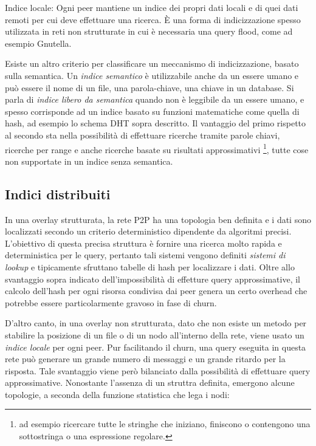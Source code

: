 Indice locale: Ogni peer mantiene un indice dei propri dati locali e di quei dati remoti per cui deve effettuare una ricerca. È una forma di indicizzazione spesso utilizzata in reti non strutturate in cui è necessaria una query flood, come ad esempio Gnutella.

Esiste un altro criterio per classificare un meccanismo di indicizzazione, basato sulla semantica. Un \emph{indice semantico} è utilizzabile anche da un essere umano e può essere il nome di un file, una parola-chiave, una chiave in un database. Si parla di \emph{indice libero da semantica} quando non è leggibile da un essere umano, e spesso corrisponde ad un indice basato su funzioni matematiche come quella di hash, ad esempio lo schema DHT sopra descritto. Il vantaggio del primo rispetto al secondo sta nella possibilità di effettuare ricerche tramite parole chiavi, ricerche per range e anche ricerche basate su risultati approssimativi \footnote{ad esempio ricercare tutte le stringhe che   iniziano, finiscono o contengono una sottostringa o una espressione   regolare.}, tutte cose non supportate in un indice senza semantica.

\subsection{Indici distribuiti}\label{indici-distribuiti-todo-probabilmente-posso-eliminare}

In una overlay strutturata, la rete P2P ha una topologia ben definita e i dati sono localizzati secondo un criterio deterministico dipendente da algoritmi precisi. L'obiettivo di questa precisa struttura è fornire una ricerca molto rapida e deterministica per le query, pertanto tali sistemi vengono definiti \emph{sistemi di lookup} e tipicamente sfruttano tabelle di hash per localizzare i dati. Oltre allo svantaggio sopra indicato dell'impossibilità di effetture query approssimative, il calcolo dell'hash per ogni risorsa condivisa dai peer genera un certo overhead che potrebbe essere particolarmente gravoso in fase di churn.

D'altro canto, in una overlay non strutturata, dato che non esiste un metodo per stabilire la posizione di un file o di un nodo all'interno della rete, viene usato un \emph{indice locale} per ogni peer. Pur facilitando il churn, una query eseguita in questa rete può generare un grande numero di messaggi e un grande ritardo per la risposta. Tale svantaggio viene però bilanciato dalla possibilità di effettuare query approssimative. Nonostante l'assenza di un struttra definita, emergono alcune topologie, a seconda della funzione statistica che lega i nodi:

